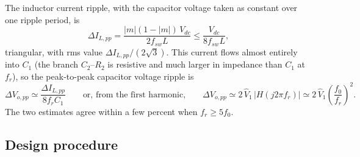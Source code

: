 \documentclass[11pt,a4paper]{article}
\begin{document}
The inductor current ripple, with the capacitor voltage taken as constant over one
ripple period, is
\begin{equation}
\Delta I_{L,pp} = \frac{|m|(1 - |m|)\,V_{dc}}{2 f_{sw} L} \le \frac{V_{dc}}{8 f_{sw} L},
\label{eq:dIL}
\end{equation}
triangular, with rms value $\Delta I_{L,pp}/(2\sqrt 3)$. This current flows almost
entirely into $C_1$ (the branch $C_2$--$R_2$ is resistive and much larger in impedance
than $C_1$ at $f_r$), so the peak-to-peak capacitor voltage ripple is
\begin{equation}
\Delta V_{o,pp} \simeq \frac{\Delta I_{L,pp}}{8 f_r C_1}
\qquad\text{or, from the first harmonic,}\qquad
\Delta V_{o,pp} \simeq 2\,\hat V_1\,|H(j 2\pi f_r)| \simeq 2\,\hat V_1 \left(\frac{f_0}{f_r}\right)^2 .
\label{eq:dVo}
\end{equation}
The two estimates agree within a few percent when $f_r \ge 5 f_0$.

\subsection{Design procedure}
\label{sec:procedure}
\end{document}

